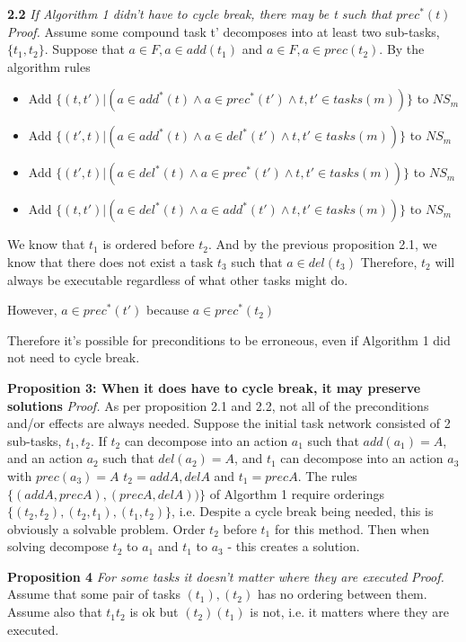 \textbf{2.2} \textit{If Algorithm 1 didn't have to cycle break, there may be t such that $prec^{*}(t)$ } \newline
\textit{Proof.}
Assume some compound task t' decomposes into at least two sub-tasks, $\{t_1, t_2\}$. Suppose that $a \in F, a \in add(t_1)$ and
$a \in F, a \in prec(t_2)$. By the algorithm rules
\begin{itemize}			
		\item Add $\{ (t, t') |  (a \in add^{*}(t) \land a \in prec^{*}(t') \land t, t' \in tasks(m) ) \}$ to $NS_m$ 
		\item Add $\{ (t', t) |  (a \in add^{*}(t) \land a \in del^{*}(t') \land t, t' \in tasks(m) ) \}$ to $NS_m$ 
		\item Add $\{ (t', t) |  (a \in del^{*}(t) \land a \in prec^{*}(t') \land t, t' \in tasks(m) ) \}$ to $NS_m$ 
		\item Add $\{ (t, t') |  (a \in del^{*}(t) \land a \in add^{*}(t') \land t, t' \in tasks(m) ) \}$ to $NS_m$ 
\end{itemize}	
We know that $t_1$ is ordered before $t_2$. And by the previous proposition 2.1, we know that there does not exist a task $t_3$
such that $a \in del(t_3)$ Therefore, $t_2$ will always be executable regardless of what other tasks might do.

However, $a \in prec^{*}(t')$ because $a \in prec^{*}(t_2)$

Therefore it's possible for preconditions to be erroneous, even if Algorithm 1 did not need to cycle break.



\textbf{Proposition 3: When it does have to cycle break, it may preserve solutions} \newline
\textit{Proof.}
As per proposition 2.1 and 2.2, not all of the preconditions and/or effects are always needed. Suppose the initial task network consisted of 2 sub-tasks, $t_1, t_2$. If $t_2$ can decompose into an action $a_1$ such that $add(a_1) = A$, and an action $a_2$ such that $del(a_2) = A$,
and $t_1$ can decompose into an action $a_3$ with $prec(a_3) = A$
$t_2 = {add A, del A}$ and $t_1 = {prec A}$. The rules $\{(add A, prec A), (prec A, del A))\}$ of Algorthm 1
require orderings $\{(t_2, t_2), (t_2, t_1), (t_1, t_2)\}$, i.e.
Despite a cycle break being needed, this is obviously a solvable problem. Order $t_2$ before $t_1$ for this method.
Then when solving decompose $t_2$ to $a_1$ and $t_1$ to $a_3$ - this creates a solution.


\textbf{Proposition 4} \textit{For some tasks it doesn't matter where they are executed} \newline
\textit{Proof.}
Assume that some pair of tasks $(t_1), (t_2)$ has no ordering between them. Assume also that $t_1 t_2$ is ok but $(t_2) (t_1)$ is not, i.e.
it matters where they are executed.

